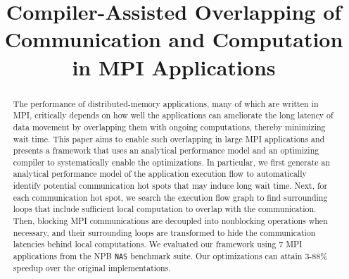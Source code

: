 \documentclass[10pt, conference, compsocconf]{IEEEtran}
\begin{document}
%
%
\title{Compiler-Assisted Overlapping of Communication and Computation in MPI Applications}

\author{
  \and 
  \and 
  }

\maketitle

\begin{abstract}
The performance of distributed-memory applications, many of which are
written in MPI, critically depends on how well the applications can
ameliorate the long latency of data movement by overlapping
them with ongoing computations, thereby minimizing wait time.  This
paper aims to
enable such overlapping in large MPI applications and presents a
framework that uses an analytical performance model and an optimizing compiler
to systematically enable the optimizations.  In particular, we first generate an
analytical performance model of the application execution flow to automatically identify potential communication hot spots
that may induce long wait time.  Next, for each communication hot
spot, we search the execution flow graph to find surrounding loops that
include sufficient local computation to overlap with the
communication.  Then, blocking MPI communications are decoupled into
nonblocking operations when necessary, and their surrounding loops are
transformed to hide the communication latencies behind local
computations.  We evaluated our framework using 7 MPI applications
from the NPB \texttt{NAS} benchmark suite.  Our optimizations can attain
3-88\% speedup over the original implementations.
\end{abstract}
\end{document}
